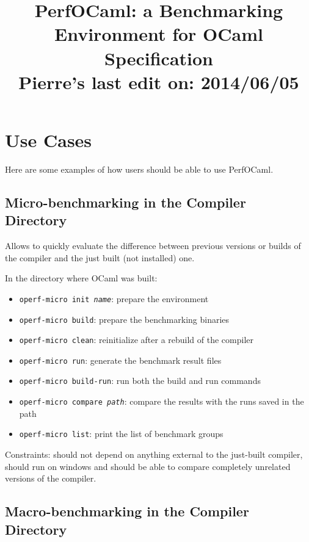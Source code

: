 \documentclass[11pt,a4paper]{article}
\begin{document}
\title{PerfOCaml: a Benchmarking Environment for OCaml\\Specification\\Pierre's last edit on: 2014/06/05}

\maketitle
\tableofcontents
\section{Use Cases}

Here are some examples of how users should be able to use PerfOCaml.

\subsection{Micro-benchmarking in the Compiler Directory}

Allows to quickly evaluate the difference between previous versions or
builds of the compiler and the just built (not installed) one.

In the directory where OCaml was built:
\begin{itemize}
\item {\tt operf-micro init {\em name}}: prepare the environment
\item {\tt operf-micro build}: prepare the benchmarking binaries
\item {\tt operf-micro clean}: reinitialize after a rebuild of the compiler
\item {\tt operf-micro run}: generate the benchmark result files
\item {\tt operf-micro build-run}: run both the build and run commands
\item {\tt operf-micro compare {\em path}}: compare the results with the runs saved in the path
\item {\tt operf-micro list}: print the list of benchmark groups
\end{itemize}

Constraints: should not depend on anything external to the just-built
compiler, should run on windows and should be able to compare
completely unrelated versions of the compiler.

\subsection{Macro-benchmarking in the Compiler Directory}
\end{document}
